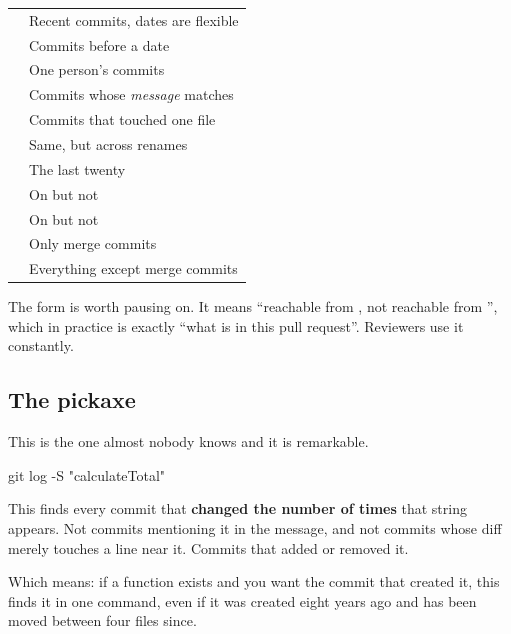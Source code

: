 \documentclass[11pt]{article}
\begin{document}
\vspace{0.5em}
\begin{tabularx}{\linewidth}{@{}L{6.4cm} X@{}}
\toprule
{} &  \\
\midrule
{} & Recent commits, dates are flexible \\
 & Commits before a date \\
 & One person's commits \\
 & Commits whose \emph{message} matches \\
 & Commits that touched one file \\
 & Same, but across renames \\
 & The last twenty \\
 & On  but not  \\
 & On  but not  \\
 & Only merge commits \\
 & Everything except merge commits \\
\bottomrule
\end{tabularx}
\vspace{0.5em}

The  form is worth pausing on. It means ``reachable from
, not reachable from '', which in practice is exactly ``what is
in this pull request''. Reviewers use it constantly.

\subsection{The pickaxe}

This is the one almost nobody knows and it is remarkable.

\begin{shell}
git log -S "calculateTotal"
\end{shell}

This finds every commit that \textbf{changed the number of times} that string
appears. Not commits mentioning it in the message, and not commits whose diff merely
touches a line near it. Commits that added or removed it.

Which means: if a function exists and you want the commit that created it, this
finds it in one command, even if it was created eight years ago and has been moved
between four files since.
\end{document}
